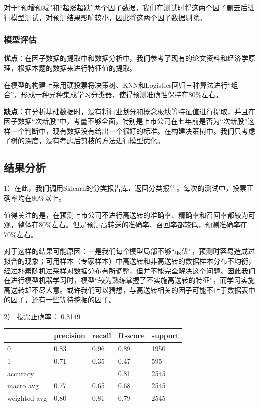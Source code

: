 \documentclass[lang=cn,12pt]{elegantpaper}
\begin{document}
对于“预增预减”和“超涨超跌”两个因子数据，我们在测试时将这两个因子删去后进行模型测试，对预测结果影响较小，因此将这两个因子数据剔除。

\subsubsection{模型评估}

\textbf{优点}：在因子数据的提取中和数据分析中，我们参考了现有的论文资料和经济学原理，根据本题的数据来进行特征值的提取。

在模型的构建上采用硬投票将决策树、KNN和Logistics回归三种算法进行“组合”，形成一种异种集成学习分类器，使得预测准确性保持在80\%左右。

\textbf{缺点}：在分析基础数据时，没有将行业划分和概念板块等特征值进行提取，并且在因子数据“次新股”中，考量不够全面，特别是上市公司在七年前是否为“次新股”这样一个判断中，现有数据没有给出一个很好的标准。在构建决策树中。我们只考虑了树的深度，没有考虑后剪枝的方法进行模型优化。

\subsection{结果分析}

1）在此，我们调用Sklearn的分类报告库，返回分类报告。每次的测试中，投票正确率均在80\%以上。

值得关注的是，在预测上市公司不进行高送转的准确率、精确率和召回率都较为可观，整体在80\%左右。但是预测高转送的准确率、召回率都较低，预测准确率在70\%左右。

对于这样的结果可能原因：一是我们每个模型局部不够“最优”，预测时容易造成过拟合的现象；可用样本（专家样本）中高送转和非高送转的数据样本分布不均衡，经过朴素随机过采样对数据分布有所调整，但并不能完全解决这个问题。因此我们在进行模型机器学习时，模型“较为熟练掌握了不实施高送转的特征”，而学习实施高送转却不尽人意。或许我们可以猜想，与高送转相关的因子可能不止于数据表中的因子，还有一些等待挖掘的因子。


2） 投票正确率： 0.8149

\begin{center}
		\begin{tabular}{|l|l|l|l|l|}
			\hline
			& precision & recall & f1-score & support \\\hline
			0            & 0.83      & 0.96   & 0.89     & 1950    \\\hline
			1            & 0.71      & 0.35   & 0.47     & 595     \\\hline
			accuracy     &           &        & 0.81     & 2545    \\\hline
			macro avg    & 0.77      & 0.65   & 0.68     & 2545    \\\hline
			weighted avg & 0.80      & 0.81   & 0.79     & 2545   \\\hline
		\end{tabular}
\end{center}
\end{document}
